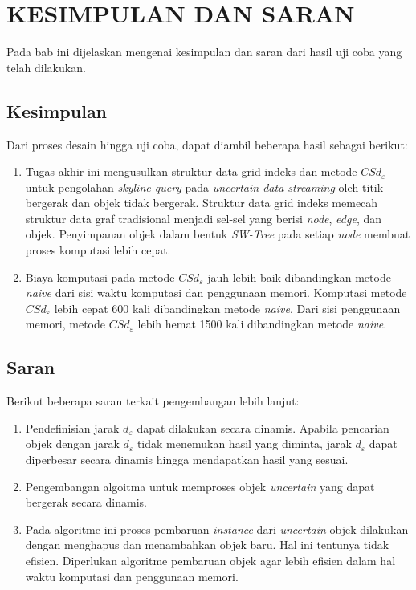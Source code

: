 \chapter{KESIMPULAN DAN SARAN}\label{chap:kesimpulan-saran}

\tab Pada bab ini dijelaskan mengenai kesimpulan dan saran dari hasil uji coba yang telah dilakukan.

\section{Kesimpulan}

\tab Dari proses desain hingga uji coba, dapat diambil beberapa hasil sebagai berikut:

\begin{enumerate}
	\item Tugas akhir ini mengusulkan struktur data grid indeks dan metode $ CSd_\varepsilon $ untuk pengolahan \textit{skyline query} pada \textit{uncertain data streaming} oleh titik bergerak dan objek tidak bergerak. Struktur data grid indeks memecah struktur data graf tradisional menjadi sel-sel yang berisi \textit{node}, \textit{edge}, dan objek. Penyimpanan objek dalam bentuk \textit{SW-Tree} pada setiap \textit{node} membuat proses komputasi lebih cepat.
	
	\item Biaya komputasi pada metode $ CSd_\varepsilon $ jauh lebih baik dibandingkan metode \textit{naive} dari sisi waktu komputasi dan penggunaan memori. Komputasi metode $ CSd_\varepsilon $ lebih cepat 600 kali dibandingkan metode \textit{naive}. Dari sisi penggunaan memori, metode $ CSd_\varepsilon $ lebih hemat 1500 kali dibandingkan metode \textit{naive}.
\end{enumerate}

\section{Saran}

\tab Berikut beberapa saran terkait pengembangan lebih lanjut:

\begin{enumerate}
	\item Pendefinisian jarak $ d_\varepsilon $ dapat dilakukan secara dinamis. Apabila pencarian objek dengan jarak $ d_\varepsilon $ tidak menemukan hasil yang diminta, jarak $ d_\varepsilon $ dapat diperbesar secara dinamis hingga mendapatkan hasil yang sesuai.
	\item Pengembangan algoitma untuk memproses objek \textit{uncertain} yang dapat bergerak secara dinamis.
	\item Pada algoritme ini proses pembaruan \textit{instance} dari \textit{uncertain} objek dilakukan dengan menghapus dan menambahkan objek baru. Hal ini tentunya tidak efisien. Diperlukan algoritme pembaruan objek agar lebih efisien dalam hal waktu komputasi dan penggunaan memori.
\end{enumerate}



